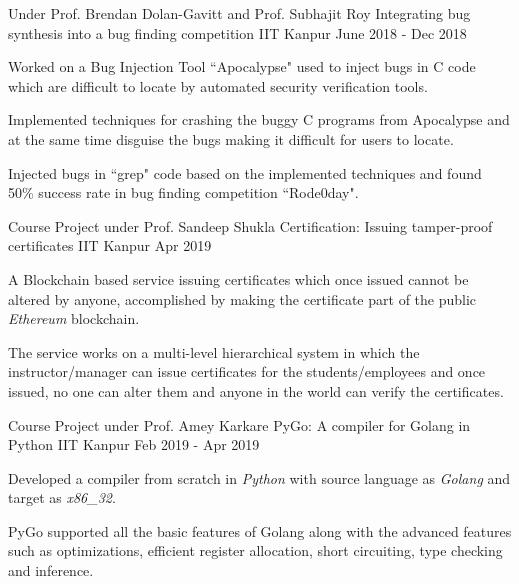 \begin{cventries}


  \cventry
    {Under Prof. Brendan Dolan-Gavitt and Prof. Subhajit Roy} %
    {Integrating bug synthesis into a bug finding competition} %
    {IIT Kanpur} %
    {June 2018 - Dec 2018} %
    {
      \begin{cvitems} %
        \item {Worked on a Bug Injection Tool ``Apocalypse" used to inject bugs in C code which are difficult to locate by automated security verification tools.}
        \item {Implemented techniques for crashing the buggy C programs from Apocalypse and at the same time disguise the bugs making it difficult for users to locate.}
        \item {Injected bugs in ``grep" code based on the implemented techniques and found 50\% success rate in bug finding competition ``Rode0day".}
      \end{cvitems}
    }



  \cventry
    {Course Project under Prof. Sandeep Shukla} %
    {Certification: Issuing tamper-proof certificates} %
    {IIT Kanpur} %
    {Apr 2019} %
    {
      \begin{cvitems} %
        \item {A Blockchain based service issuing certificates which once issued cannot be altered by anyone, accomplished by making the certificate part of the public \textit{Ethereum} blockchain.}
        \item {The service works on a multi-level hierarchical system in which the instructor/manager can issue certificates for the students/employees and once issued, no one can alter them and anyone in the world can verify the certificates.}
      \end{cvitems}
    }



  \cventry
    {Course Project under Prof. Amey Karkare} %
    {PyGo: A compiler for Golang in Python} %
    {IIT Kanpur} %
    {Feb 2019 - Apr 2019} %
    {
      \begin{cvitems} %
      \item {Developed a compiler from scratch in \textit{Python} with source language as \textit{Golang} and target as \textit{x86\_32}.}
      \item {PyGo supported all the basic features of Golang along with the advanced features such as optimizations, efficient register allocation, short circuiting, type checking and inference.}
      \end{cvitems}
    }


\end{cventries}
